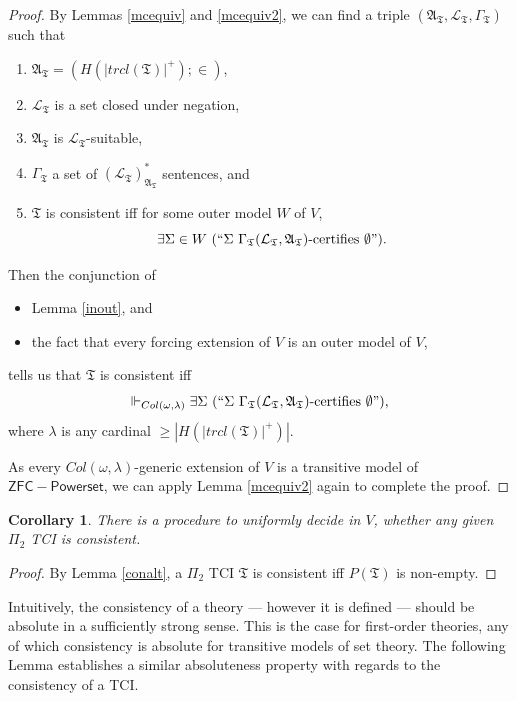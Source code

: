 \documentclass[12pt, twoside]{memoir}
\numberwithin{equation}{section}
\newtheorem{cor}[thm]{Corollary}
\theoremstyle{definition}
\theoremstyle{remark}
\theoremstyle{definition}
\theoremstyle{definition}
\theoremstyle{definition}
\theoremstyle{remark}
\begin{document}
\begin{proof}
By Lemmas \ref{mcequiv} and \ref{mcequiv2}, we can find a triple $(\mathfrak{A}_{\mathfrak{T}}, \mathcal{L}_{\mathfrak{T}}, \Gamma_{\mathfrak{T}})$ such that 
\begin{enumerate}[label=(\alph*)]
    \item $\mathfrak{A}_{\mathfrak{T}} = (H(|trcl(\mathfrak{T})|^+); \in)$,
    \item $\mathcal{L}_{\mathfrak{T}}$ is a set closed under negation, 
    \item $\mathfrak{A}_{\mathfrak{T}}$ is $\mathcal{L}_{\mathfrak{T}}$-suitable, 
    \item $\Gamma_{\mathfrak{T}}$ a set of $({\mathcal{L}_{\mathfrak{T}}})^*_{\mathfrak{A}_{\mathfrak{T}}}$ sentences, and
    \item $\mathfrak{T}$ is consistent iff for some outer model $W$ of $V$, $$\exists \Sigma \in W \ (``\Sigma \ \Gamma_{\mathfrak{T}} (\mathcal{L}_{\mathfrak{T}}, \mathfrak{A}_{\mathfrak{T}})\text{-certifies } \emptyset").$$
\end{enumerate}
Then the conjunction of
\begin{itemize}
    \item Lemma \ref{inout}, and
    \item the fact that every forcing extension of $V$ is an outer model of $V$,
\end{itemize}   
tells us that $\mathfrak{T}$ is consistent iff $$\Vdash_{Col(\omega, \lambda)} \exists \Sigma \ (``\Sigma \ \Gamma_{\mathfrak{T}} (\mathcal{L}_{\mathfrak{T}}, \mathfrak{A}_{\mathfrak{T}})\text{-certifies } \emptyset") \text{,}$$ where $\lambda$ is any cardinal $\geq |H(|trcl(\mathfrak{T})|^+)|$. 

As every $Col(\omega, \lambda)$-generic extension of $V$ is a transitive model of $\mathsf{ZFC - Powerset}$, we can apply Lemma \ref{mcequiv2} again to complete the proof. 
\end{proof}

\begin{cor}\label{cor527}
There is a procedure to uniformly decide in $V$, whether any given $\Pi_2$ TCI is consistent.
\end{cor}

\begin{proof}
By Lemma \ref{conalt}, a $\Pi_2$ TCI $\mathfrak{T}$ is consistent iff $P(\mathfrak{T})$ is non-empty.
\end{proof} 

Intuitively, the consistency of a theory --- however it is defined --- should be absolute in a sufficiently strong sense. This is the case for first-order theories, any of which consistency is absolute for transitive models of set theory. The following Lemma establishes a similar absoluteness property with regards to the consistency of a TCI.
\end{document}
